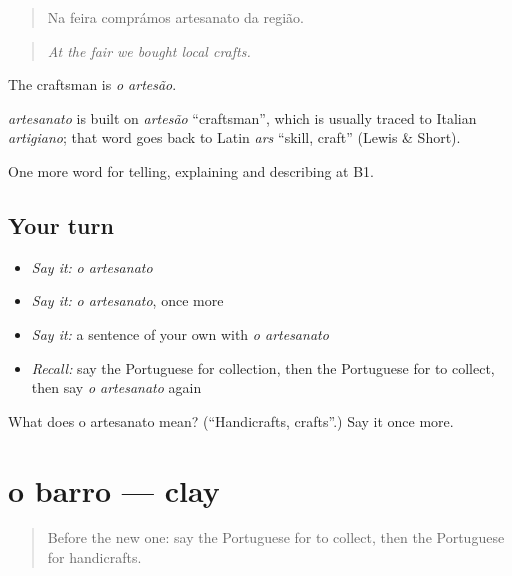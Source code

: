 \begin{quote}
Na feira comprámos artesanato da região.
\end{quote}

\begin{quote}
\emph{At the fair we bought local crafts.}
\end{quote}

The craftsman is \emph{o artesão}.

\begin{cousinweb}
\emph{artesanato} is built on \emph{artesão} \textquotedblleft{}craftsman\textquotedblright{}, which is usually traced to Italian \emph{artigiano}; that word goes back to Latin \emph{ars} \textquotedblleft{}skill, craft\textquotedblright{} (Lewis \& Short).
\end{cousinweb}

\begin{grammarlens}[title={What you've built}]
One more word for telling, explaining and describing at B1.
\end{grammarlens}

\subsection*{Your turn}
\begin{itemize}
\raggedright
  \item \emph{Say it:} \emph{o artesanato}
  \item \emph{Say it:} \emph{o artesanato}, once more
  \item \emph{Say it:} a sentence of your own with \emph{o artesanato}
  \item \emph{Recall:} say the Portuguese for collection, then the Portuguese for to collect, then say \emph{o artesanato} again
\end{itemize}

\begin{tcolorbox}[breakable,colback=teal!4,colframe=teal!35!black,title={Before you move on}]
What does o artesanato mean? (\textquotedblleft{}Handicrafts, crafts\textquotedblright{}.) Say it once more.
\end{tcolorbox}
\section[o barro]{o barro — clay}

\label{lesson:PT-C504-barro}



\begin{quote}
Before the new one: say the Portuguese for to collect, then the Portuguese for handicrafts.
\end{quote}

